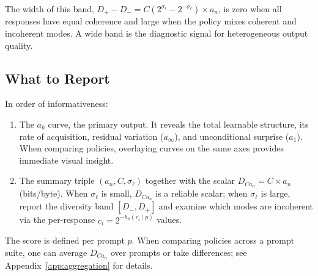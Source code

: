 The width of this band, $D_+ - D_- = C(2^{\sigma_\ell} - 2^{-\sigma_\ell}) \times a_n$, is zero when all responses have equal coherence and large when the policy mixes coherent and incoherent modes.
A wide band is the diagnostic signal for heterogeneous output quality.

\subsection{What to Report}

In order of informativeness:
\begin{enumerate}[nosep]
    \item The $a_k$ curve, the primary output.
It reveals the total learnable structure, its rate of acquisition, residual variation ($a_\infty$), and unconditional surprise ($a_1$).
When comparing policies, overlaying curves on the same axes provides immediate visual insight.
    \item The summary triple $(a_n, C, \sigma_\ell)$ together with the scalar $D_{Ca_n} = C \times a_n$ (bits/byte).
When $\sigma_\ell$ is small, $D_{Ca_n}$ is a reliable scalar; when $\sigma_\ell$ is large, report the diversity band $[D_-, D_+]$ and examine which modes are incoherent via the per-response $c_i = 2^{-h_\theta(r_i \mid p)}$ values.
\end{enumerate}

The score is defined per prompt $p$.
When comparing policies across a prompt suite, one can average $D_{Ca_n}$ over prompts or take differences; see Appendix~\ref{app:aggregation} for details.

